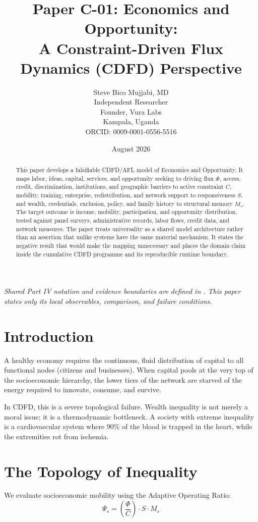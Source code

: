 \documentclass[11pt,a4paper]{article}
\title{\textbf{Paper C-01: Economics and Opportunity:\\ A Constraint-Driven Flux Dynamics (CDFD) Perspective}}
\author{Steve Bico Mujjabi, MD\\
\small Independent Researcher\\
\small Founder, Vura Labs\\
\small Kampala, Uganda\\
\small ORCID: 0009-0001-0556-5516}
\date{August 2026}
\begin{document}
\maketitle

\noindent\textit{Shared Part IV notation and evidence boundaries are defined in . This paper states only its local observables, comparison, and failure conditions.}


\begin{abstract}
This paper develops a falsifiable CDFD/AFL model of Economics and Opportunity. It maps labor, ideas, capital, services, and opportunity seeking to driving flux $\Phi$, access, credit, discrimination, institutions, and geographic barriers to active constraint $C$, mobility, training, enterprise, redistribution, and network support to responsiveness $S$, and wealth, credentials, exclusion, policy, and family history to structural memory $M_s$. The target outcome is income, mobility, participation, and opportunity distribution, tested against panel surveys, administrative records, labor flows, credit data, and network measures. The paper treats universality as a shared model architecture rather than an assertion that unlike systems have the same material mechanism. It states the negative result that would make the mapping unnecessary and places the domain claim inside the cumulative CDFD programme and its reproducible runtime boundary.
\end{abstract}

\section{Introduction}

A healthy economy requires the continuous, fluid distribution of capital to all functional nodes (citizens and businesses). When capital pools at the very top of the socioeconomic hierarchy, the lower tiers of the network are starved of the energy required to innovate, consume, and survive.

In CDFD, this is a severe topological failure. Wealth inequality is not merely a moral issue; it is a thermodynamic bottleneck. A society with extreme inequality is a cardiovascular system where 90\% of the blood is trapped in the heart, while the extremities rot from ischemia.

\section{The Topology of Inequality}
We evaluate socioeconomic mobility using the Adaptive Operating Ratio:
\begin{equation}
    \Psi_s = \left( \frac{\Phi}{C} \right) \cdot S \cdot M_s
\end{equation}
\end{document}
